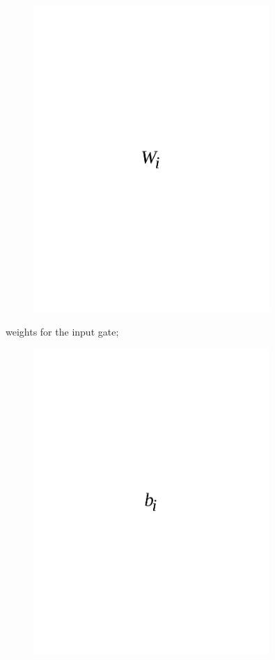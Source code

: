 \begin{figure}[H]
	\centering
	\includegraphics[width=0.8\textwidth]{media/ict/image54}
	\caption*{}
\end{figure}

weights for the input gate;
\begin{figure}[H]
	\centering
	\includegraphics[width=0.8\textwidth]{media/ict/image55}
	\caption*{}
\end{figure}

